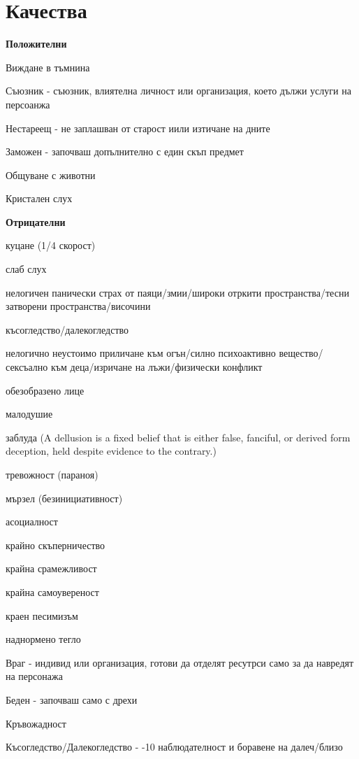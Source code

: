 \chapter{Качества}

\textbf{Положителни}
\begin{itemize*}
\item{Виждане в тъмнина}
\item{Съюзник - съюзник, влиятелна личност или организация, което дължи услуги на персоанжа}
\item{Нестареещ - не заплашван от старост иили изтичане на дните}
\item{Заможен - започваш допълнително с един скъп предмет}
\item{Общуване с животни}
\item{Кристален слух}
\end{itemize*}

\vspace{0.7cm}
\textbf{Отрицателни}
\begin{itemize*}
\item{куцане (1/4 скорост)}
\item{слаб слух}
\item{нелогичен панически страх от паяци/змии/широки отркити пространства/тесни затворени пространства/височини}
\item{късогледство/далекогледство}
\item{нелогично неустоимо приличане към огън/силно психоактивно вещество/сексъално към деца/изричане на лъжи/физически конфликт}
\item{обезобразено лице}
\item{малодушие}
\item{заблуда (A dellusion is a fixed belief that is either false, fanciful, or derived form deception, held despite evidence to the contrary.)}
\item{тревожност (параноя)}
\item{мързел (безинициативност)}
\item{асоциалност}
\item{крайно скъперничество}
\item{крайна срамежливост}
\item{крайна самоувереност}
\item{краен песимизъм}
\item{наднормено тегло}
\item{Враг - индивид или организация, готови да отделят ресутрси само за да навредят на персонажа}
\item{Беден - започваш само с дрехи}
\item{Кръвожадност}
\item{Късогледство/Далекогледство - -10 наблюдателност и боравене на далеч/близо}
\end{itemize*}

